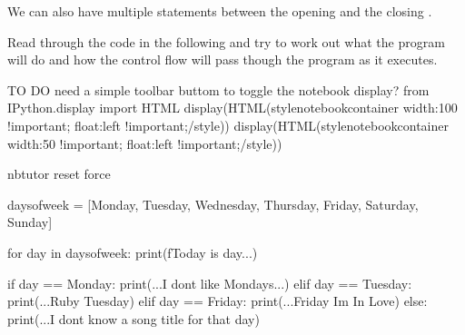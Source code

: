 \documentclass[letterpaper,10pt,english]{sphinxmanual}
\begin{document}
We can also have multiple  statements between the opening  and the closing .

Read through the code in the following and try to work out what the program will do and how the control flow will pass though the program as it executes.

{
\begin{sphinxVerbatim}[commandchars=\\\{\}]
\llap{\color{nbsphinxin}[ ]:\,\hspace{\fboxrule}\hspace{\fboxsep}}\PYGZsh{} TO DO
\PYGZsh{} need a simple toolbar buttom to toggle the notebook display?
from IPython.display import HTML
display(HTML(\PYGZdq{}\PYGZlt{}style\PYGZgt{}\PYGZsh{}notebook\PYGZhy{}container \PYGZob{} width:100\PYGZpc{} !important; float:left !important;\PYGZcb{}\PYGZlt{}/style\PYGZgt{}\PYGZdq{}))
display(HTML(\PYGZdq{}\PYGZlt{}style\PYGZgt{}\PYGZsh{}notebook\PYGZhy{}container \PYGZob{} width:50\PYGZpc{} !important; float:left !important;\PYGZcb{}\PYGZlt{}/style\PYGZgt{}\PYGZdq{}))

\end{sphinxVerbatim}
}

{
\begin{sphinxVerbatim}[commandchars=\\\{\}]
\llap{\color{nbsphinxin}[ ]:\,\hspace{\fboxrule}\hspace{\fboxsep}}\PYGZpc{}\PYGZpc{}nbtutor \PYGZhy{}\PYGZhy{}reset \PYGZhy{}\PYGZhy{}force

days\PYGZus{}of\PYGZus{}week = [\PYGZsq{}Monday\PYGZsq{}, \PYGZsq{}Tuesday\PYGZsq{}, \PYGZsq{}Wednesday\PYGZsq{}, \PYGZsq{}Thursday\PYGZsq{},
                \PYGZsq{}Friday\PYGZsq{}, \PYGZsq{}Saturday\PYGZsq{}, \PYGZsq{}Sunday\PYGZsq{}]

for day in days\PYGZus{}of\PYGZus{}week:
    print(f\PYGZsq{}Today is \PYGZob{}day\PYGZcb{}...\PYGZsq{})

    if day == \PYGZsq{}Monday\PYGZsq{}:
        print(\PYGZdq{}...I don\PYGZsq{}t like Mondays...\PYGZdq{})
    elif day == \PYGZsq{}Tuesday\PYGZsq{}:
        print(\PYGZsq{}...Ruby Tuesday\PYGZsq{})
    elif day == \PYGZsq{}Friday\PYGZsq{}:
        print(\PYGZdq{}...Friday I\PYGZsq{}m In Love\PYGZdq{})
    else:
        print(\PYGZdq{}...I don\PYGZsq{}t know a song title for that day\PYGZdq{})
\end{sphinxVerbatim}
}
\end{document}
